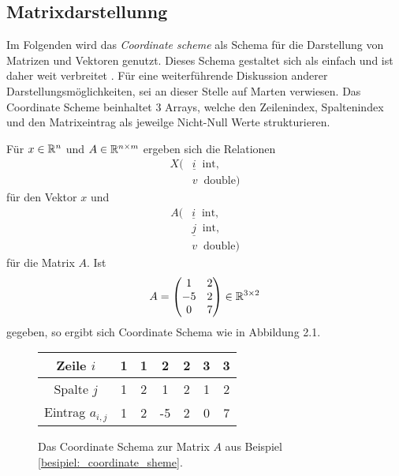 \subsection{Matrixdarstellunng}
Im Folgenden wird das \textit{Coordinate scheme} \cite{martendiss} als Schema für die Darstellung  von Matrizen und Vektoren genutzt. Dieses Schema gestaltet sich als einfach und ist daher weit verbreitet \cite{saad1990sparskit}.
Für eine weiterführende Diskussion anderer Darstellungsmöglichkeiten, sei an dieser Stelle auf Marten \cite{martendiss} verwiesen. 
Das Coordinate Scheme beinhaltet 3 Arrays, welche den Zeilenindex, Spaltenindex und den Matrixeintrag als jeweilge Nicht-Null Werte strukturieren. 
\begin{bsp}
    \label{besipiel:_coordinate_sheme}
    Für $x \in \mathbb{R}^n$ und $A \in \mathbb{R}^{n \times m}$ ergeben sich die Relationen
    \begin{align*}
        X( &\underline{i} \; \; \mathrm{int}, \\
        &v \; \; \mathrm{double})
    \end{align*}
    für den Vektor $x$ und
    \begin{align*}
        A( &\underline{i} \; \; \mathrm{int}, \\
        &\underline{j} \; \;\mathrm{int},\\
        &v \; \; \mathrm{double})
    \end{align*} für die Matrix $A$.
    Ist
    \begin{equation*}
        A=\begin{pmatrix}
            1 & 2 \\
            -5 & 2 \\
            0 & 7 \\
        \end{pmatrix}
        \in \mathbb{R}^{3 \times 2}
    \end{equation*}
    gegeben, so ergibt sich Coordinate Schema wie in Abbildung 2.1.
\end{bsp}

\begin{figure}[h]
    \label{coordinate_scheme_table}
    \centering
    \begin{tabular}{ |c|c|c|c|c|c|c| } 
     \hline
     Zeile $i$ &1 &1 &2 &2 &3 &3 \\ 
     \hline
     Spalte $j$ &1 &2 &1 &2 &1 &2 \\ 
     \hline
     Eintrag $a_{i,j}$ &1 &2 &-5 &2 &0 &7 \\ 
     \hline
    \end{tabular}
    \caption{Das Coordinate Schema zur Matrix $A$ aus Beispiel \ref{besipiel:_coordinate_sheme}.}
\end{figure}



